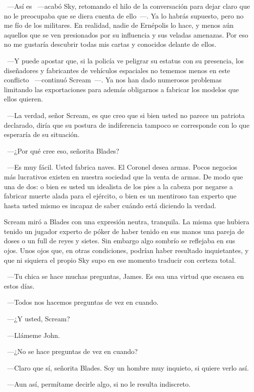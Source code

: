 ~---Así es ~---acabó Sky, retomando el hilo de la conversación para dejar claro que no le preocupaba que se diera cuenta de ello~---. Ya lo habrás supuesto, pero no me fío de los militares. En realidad, nadie de Ernépolis lo hace, y menos aún aquellos que se ven presionados por su influencia y sus veladas amenazas. Por eso no me gustaría descubrir todas mis cartas y conocidos delante de ellos.

~---Y puede apostar que, si la policía ve peligrar su estatus con su presencia, los diseñadores y fabricantes de vehículos espaciales no tememos menos en este conflicto ~---continuó Scream~---. Ya nos han dado numerosos problemas limitando las exportaciones para además obligarnos a fabricar los modelos que ellos quieren.

~---La verdad, señor Scream, es que creo que si bien usted no parece un patriota declarado, diría que su postura de indiferencia tampoco se corresponde con lo que esperaría de su situación.

~---¿Por qué cree eso, señorita Blades?

~---Es muy fácil. Usted fabrica naves. El Coronel desea armas. Pocos negocios más lucrativos existen en nuestra sociedad que la venta de armas. De modo que una de dos: o bien es usted un idealista de los pies a la cabeza por negarse a fabricar muerte alada para el ejército, o bien es un mentiroso tan experto que hasta usted mismo es incapaz de saber cuándo está diciendo la verdad.

Scream miró a Blades con una expresión neutra, tranquila. La misma que hubiera tenido un jugador experto de póker de haber tenido en sus manos una pareja de doses o un full de reyes y sietes. Sin embargo algo sombrío se reflejaba en sus ojos. Unos ojos que, en otras condiciones, podrían haber resultado inquietantes, y que ni siquiera el propio Sky supo en ese momento traducir con certeza total.

~---Tu chica se hace muchas preguntas, James. Es esa una virtud que escasea en estos días.

~---Todos nos hacemos preguntas de vez en cuando.

~---¿Y usted, Scream?

~---Llámeme John.

~---¿No se hace preguntas de vez en cuando?

~---Claro que sí, señorita Blades. Soy un hombre muy inquieto, si quiere verlo así.

~---Aun así, permítame decirle algo, si no le resulta indiscreto.

